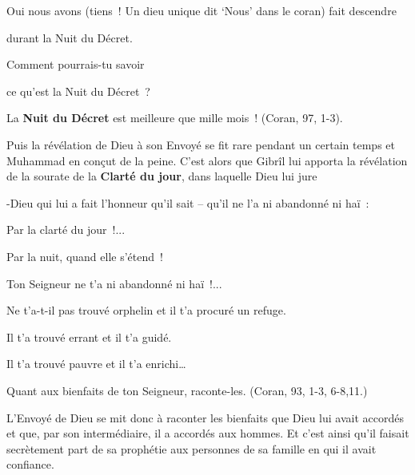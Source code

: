 {Oui nous avons (tiens~! Un dieu unique dit `Nous' dans le coran)
fait descendre}

{durant la Nuit du Décret.}

{Comment pourrais-tu savoir}

{ce qu'est la Nuit du Décret~?}

{La \textbf{Nuit du Décret} est meilleure que mille mois~! (Coran,
97, 1-3).}

Puis la révélation de Dieu à son Envoyé se fit rare pendant un certain
temps et Muhammad en conçut de la peine. C'est alors que Gibrîl lui
apporta la révélation de la sourate de la \textbf{Clarté du jour}, dans
laquelle Dieu lui jure

{-Dieu qui lui a fait l'honneur qu'il sait -- qu'il ne l'a ni
abandonné ni haï~:}

{Par la clarté du jour~!...}

{Par la nuit, quand elle s'étend~!}

{Ton Seigneur ne t'a ni abandonné ni haï~!...}

{Ne t'a-t-il pas trouvé orphelin et il t'a procuré un refuge.}

{Il t'a trouvé errant et il t'a guidé.}

{Il t'a trouvé pauvre et il t'a enrichi\ldots{}}

{Quant aux bienfaits de ton Seigneur, raconte-les. (Coran, 93, 1-3,
6-8,11.)}

L'Envoyé de Dieu se mit donc à raconter les bienfaits que Dieu lui avait
accordés et que, par son intermédiaire, il a accordés aux hommes. Et
c'est ainsi qu'il faisait secrètement part de sa prophétie aux personnes
de sa famille en qui il avait confiance.


